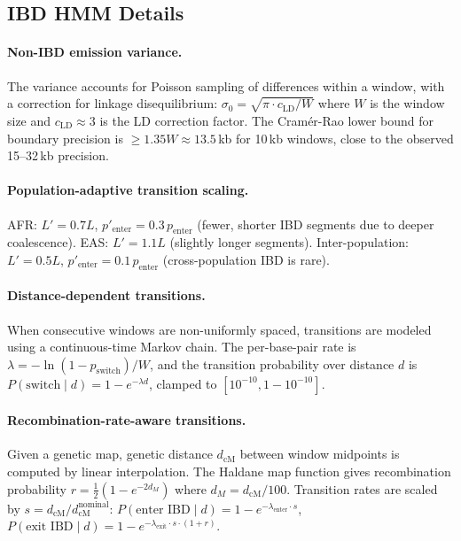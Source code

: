 \documentclass[11pt]{article}
\begin{document}
\subsection{IBD HMM Details}
\label{sec:supp_ibd_details}

\paragraph{Non-IBD emission variance.}
The variance accounts for Poisson sampling of differences within a window, with a correction for linkage disequilibrium:
$\sigma_0 = \sqrt{\pi \cdot c_{\text{LD}} / W}$
where $W$ is the window size and $c_{\text{LD}} \approx 3$ is the LD correction factor. The Cram\'er-Rao lower bound for boundary precision is $\geq 1.35W \approx 13.5$\,kb for 10\,kb windows, close to the observed 15--32\,kb precision.

\paragraph{Population-adaptive transition scaling.}
AFR: $L' = 0.7L$, $p'_{\text{enter}} = 0.3\,p_{\text{enter}}$ (fewer, shorter IBD segments due to deeper coalescence). EAS: $L' = 1.1L$ (slightly longer segments). Inter-population: $L' = 0.5L$, $p'_{\text{enter}} = 0.1\,p_{\text{enter}}$ (cross-population IBD is rare).

\paragraph{Distance-dependent transitions.}
When consecutive windows are non-uniformly spaced, transitions are modeled using a continuous-time Markov chain. The per-base-pair rate is $\lambda = -\ln(1 - p_{\text{switch}})/W$, and the transition probability over distance $d$ is $P(\text{switch} \mid d) = 1 - e^{-\lambda d}$, clamped to $[10^{-10}, 1 - 10^{-10}]$.

\paragraph{Recombination-rate-aware transitions.}
Given a genetic map, genetic distance $d_{\text{cM}}$ between window midpoints is computed by linear interpolation. The Haldane map function gives recombination probability $r = \frac{1}{2}(1 - e^{-2d_M})$ where $d_M = d_{\text{cM}}/100$. Transition rates are scaled by $s = d_{\text{cM}} / d_{\text{cM}}^{\text{nominal}}$:
$P(\text{enter IBD} \mid d) = 1 - e^{-\lambda_{\text{enter}} \cdot s}$,
$P(\text{exit IBD} \mid d) = 1 - e^{-\lambda_{\text{exit}} \cdot s \cdot (1 + r)}$.
\end{document}
